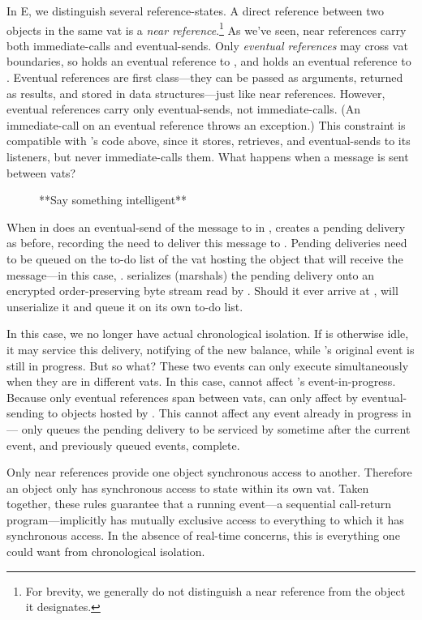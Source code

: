 \documentclass{llncs}
\begin{document}
In E, we distinguish several reference-states. A direct reference
between two objects in the same vat is a \emph{near
reference}.\footnote{For brevity, we generally do not distinguish a
near reference from the object it designates.}  As we've seen, near
references carry both immediate-calls and eventual-sends. Only
\emph{eventual references} may cross vat boundaries, so  holds
an eventual reference to , and  holds an eventual
reference to . Eventual references are first class---they
can be passed as arguments, returned as results, and stored in data
structures---just like near references. However, eventual references
carry only eventual-sends, not immediate-calls. (An immediate-call on
an eventual reference throws an exception.) This constraint is
compatible with 's code above, since it stores, retrieves,
and eventual-sends to its listeners, but never immediate-calls
them. What happens when a message is sent between vats?
%
\begin{figure}
\centerline{}
\caption{**Say something intelligent**}
\label{fig:2vat}
\end{figure}
%
When  in  does an eventual-send of the
 message to  in ,  creates
a pending delivery as before, recording the need to deliver this
message to . Pending deliveries need to be queued on the
to-do list of the vat hosting the object that will receive the
message---in this case, .  serializes (marshals) the
pending delivery onto an encrypted order-preserving byte stream read
by . Should it ever arrive at ,  will unserialize
it and queue it on its own to-do list.

In this case, we no longer have actual chronological isolation. If
 is otherwise idle, it may service this delivery, notifying
 of the new balance, while 's original event is
still in progress. But so what? These two events can only execute
simultaneously when they are in different vats. In this case,
 cannot affect 's event-in-progress. Because only
eventual references span between vats,  can only affect
 by eventual-sending to objects hosted by . This cannot
affect any event already in progress in --- only queues
the pending delivery to be serviced by  sometime after the
current event, and previously queued events, complete.

Only near references provide one object synchronous access to
another. Therefore an object only has synchronous access to state
within its own vat. Taken together, these rules guarantee that a
running event---a sequential call-return program---implicitly has
mutually exclusive access to everything to which it has synchronous
access. In the absence of real-time concerns, this is everything one
could want from chronological isolation.
\end{document}
